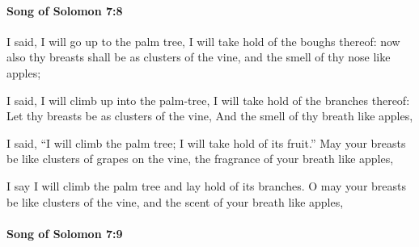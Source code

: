 		\paragraph{Song of Solomon 7:8} %
			\label{SONGOFSOLOMON-7-8}

			I said, I will go up to the palm tree, I will take hold of the boughs thereof: now also thy breasts shall be as clusters of the vine, and the smell of thy nose like apples;

			\begin{versebox}
					\item[BHS] 
					\item[LXX] 
					\item[ASV] I said, I will climb up into the palm-tree, I will take hold of the branches thereof: Let thy breasts be as clusters of the vine, And the smell of thy breath like apples,
					\item[NIV] I said, “I will climb the palm tree; I will take hold of its fruit.” May your breasts be like clusters of grapes on the vine, the fragrance of your breath like apples,
					\item[NRSV] I say I will climb the palm tree and lay hold of its branches. O may your breasts be like clusters of the vine, and the scent of your breath like apples,
			\end{versebox}

		\paragraph{Song of Solomon 7:9} %
			\label{SONGOFSOLOMON-7-9}

